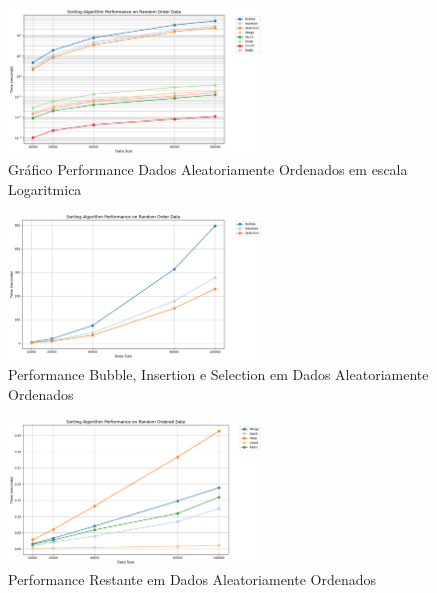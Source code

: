 \begin{figure}[H]
  \centering
  \includegraphics[width=0.6\textwidth]{images/all_algo_rand}
  \caption{Gráfico Performance Dados Aleatoriamente Ordenados em escala Logaritmica}
  \label{fig:Gráfico Performance Dados Aleatoriamente Ordenados}
\end{figure}

\begin{figure}[H]
  \centering
  \includegraphics[width=0.6\textwidth]{images/o2_random}
  \caption{Performance Bubble, Insertion e Selection em Dados Aleatoriamente Ordenados}
  \label{fig:Performance Bubble, Insertion e Selection em Dados Aleatoriamente Ordenados}
\end{figure}

\begin{figure}[H]
  \centering
  \includegraphics[width=0.6\textwidth]{images/o_random}
  \caption{Performance Restante em Dados Aleatoriamente Ordenados }
  \label{fig:Gráfico Performance Dados Aleatoriamente Ordenados}
\end{figure}

